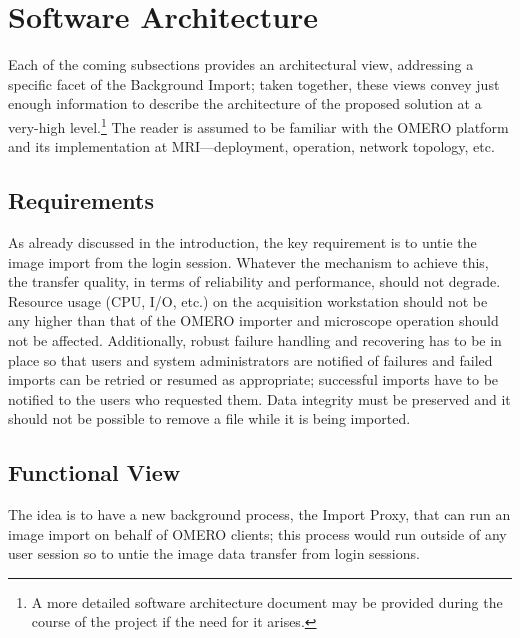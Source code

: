 \section{Software Architecture}

Each of the coming subsections provides an architectural view\cite{soni:views,
kruchten:views}, addressing a specific facet of the Background Import; taken 
together, these views convey just enough information to describe the architecture
of the proposed solution at a very-high level.\footnote{A more detailed software 
architecture document may be provided during the course of the project if the need
for it arises.}
The reader is assumed to be familiar with the OMERO platform and its implementation
at MRI---deployment, operation, network topology, etc.

\subsection{Requirements}
As already discussed in the introduction, the key requirement is to untie the image
import from the login session. Whatever the mechanism to achieve this, the transfer
quality, in terms of reliability and performance, should not degrade.
Resource usage (CPU, I/O, etc.) on the acquisition workstation should not be any
higher than that of the OMERO importer and microscope operation should not be affected.
Additionally, robust failure handling and recovering has to be in place so that users
and system administrators are notified of failures and failed imports can be retried 
or resumed as appropriate; successful imports have to be notified to the users who 
requested them. Data integrity must be preserved and it should not be possible to 
remove a file while it is being imported. 

\subsection{Functional View}
The idea is to have a new background process, the Import Proxy, that can run an image 
import on behalf of OMERO clients; this process would run outside of any user session
so to untie the image data transfer from login sessions. 

